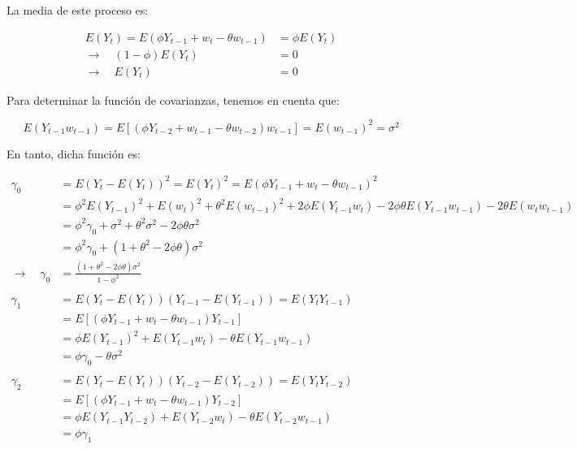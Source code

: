 \documentclass[a4paper,10pt]{article}
\begin{document}
La media de este proceso es:

\begin{equation*}
\begin{split}
E(Y_t) = E(\phi Y_{t-1} + w_t - \theta w_{t-1}) &= \phi E(Y_t) \\
\to \quad (1-\phi)E(Y_t) &= 0 \\
\to \quad E(Y_t) &= 0
\end{split}
\end{equation*}

Para determinar la función de covarianzas, tenemos en cuenta que:

\begin{equation*}
E(Y_{t-1}w_{t-1}) = E[(\phi Y_{t-2} + w_{t-1} - \theta w_{t-2})w_{t-1}] = E(w_{t-1})^2 = \sigma^2
\end{equation*}


En tanto, dicha función es:

\begin{equation*}
\begin{split}
\gamma_0 &= E(Y_t - E(Y_t))^2 = E(Y_t)^2 = E(\phi Y_{t-1} + w_t - \theta w_{t-1})^2 \\
&= \phi ^2 E(Y_{t-1})^2 + E(w_t)^2 + \theta^2 E(w_{t-1})^2 + 2\phi E(Y_{t-1}w_t) - 2\phi \theta E(Y_{t-1}w_{t-1}) - 2\theta E(w_t w_{t-1}) \\
&= \phi^2 \gamma_0 + \sigma^2 + \theta^2 \sigma^2 - 2\phi \theta \sigma^2 \\
&= \phi^2 \gamma_0 + (1+\theta^2 - 2\phi\theta) \sigma^2 \\
\to \quad \gamma_0 &= \frac{(1+\theta^2 -2\phi \theta)\sigma^2}{1-\phi^2}\\
\\ %
\gamma_1 &= E(Y_t - E(Y_t))(Y_{t-1} - E(Y_{t-1})) = E(Y_tY_{t-1}) \\
&= E[(\phi Y_{t-1} + w_t - \theta w_{t-1})Y_{t-1}] \\
&= \phi E(Y_{t-1})^2 +E(Y_{t-1}w_t) - \theta E(Y_{t-1} w_{t-1}) \\
&= \phi \gamma_0 - \theta \sigma^2 \\
\\ %
\gamma_2 &= E(Y_t - E(Y_t))(Y_{t-2} - E(Y_{t-2})) = E(Y_tY_{t-2}) \\
&= E[(\phi Y_{t-1} + w_t - \theta w_{t-1})Y_{t-2}] \\
&= \phi E(Y_{t-1}Y_{t-2}) +E(Y_{t-2}w_t) - \theta E(Y_{t-2} w_{t-1}) \\
&= \phi \gamma_1 \\
\end{split}
\end{equation*}
\end{document}
